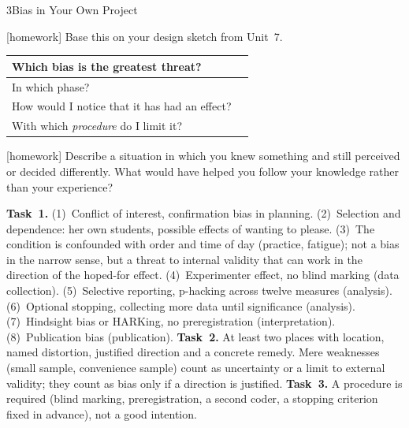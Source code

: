 \begin{uebungsblattb}{3}{Bias in Your Own Project}

[homework]
Base this on your design sketch from Unit~7.

\begin{center}
\renewcommand{\arraystretch}{1.8}
\begin{tabular}{|p{}|p{}|}
\hline
Which bias is the greatest threat? & \\ \hline
In which phase? & \\ \hline
How would I notice that it has had an effect? & \\ \hline
With which \emph{procedure} do I limit it? & \\ \hline
\end{tabular}
\end{center}

[homework]
Describe a situation in which you knew something and still perceived or
decided differently. What would have helped you follow your knowledge
rather than your experience?

\begin{lehrhinweis}
\textbf{Task~1.} (1)~Conflict of interest, confirmation bias in planning.
(2)~Selection and dependence: her own students, possible effects of
wanting to please. (3)~The condition is confounded with order and time of
day (practice, fatigue); not a bias in the narrow sense, but a threat to
internal validity that can work in the direction of the hoped-for effect.
(4)~Experimenter effect, no blind marking (data collection).
(5)~Selective reporting, p-hacking across twelve measures (analysis).
(6)~Optional stopping, collecting more data until significance
(analysis). (7)~Hindsight bias or HARKing, no preregistration
(interpretation). (8)~Publication bias (publication).
\textbf{Task~2.} At least two places with location, named distortion,
justified direction and a concrete remedy. Mere weaknesses (small sample,
convenience sample) count as uncertainty or a limit to external validity;
they count as bias only if a direction is justified.
\textbf{Task~3.} A procedure is required (blind marking, preregistration,
a second coder, a stopping criterion fixed in advance), not a good
intention.
\end{lehrhinweis}
\end{uebungsblattb}
